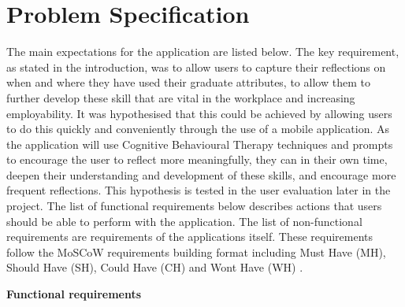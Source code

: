 \documentclass{l4proj}
\begin{document}
\section{Problem Specification}

The main expectations for the application are listed below. The key requirement, as stated in the introduction, was to allow users to capture their reflections on when and where they have used their graduate attributes, to allow them to further develop these skill that are vital in the workplace and increasing employability. It was hypothesised that this could be achieved by allowing users to do this quickly and conveniently through the use of a mobile application. As the application will use Cognitive Behavioural Therapy techniques and prompts to encourage the user to reflect more meaningfully, they can in their own time, deepen their understanding and development of these skills, and encourage more frequent reflections. This hypothesis is tested in the user evaluation later in the 
project. The list of functional requirements below describes actions that users should be able to perform with the application. The list of non-functional requirements are requirements of the applications itself. These requirements follow the MoSCoW requirements building format including Must Have (MH), Should Have (SH), Could Have (CH) and Wont Have (WH) \citep{consortium_chapter_2014}.
\par 
\textbf{Functional requirements}
\end{document}
